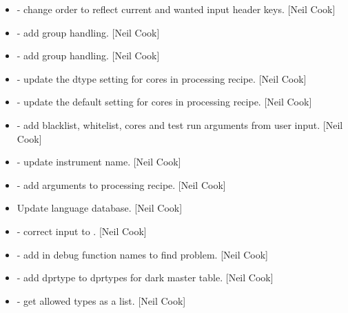 \documentclass[a4paper,10pt,english]{report}
\begin{document}
\begin{itemize}
\item {} 
 - change order to reflect
current and wanted input header keys. {[}Neil Cook{]}

\item {} 
 - add group handling. {[}Neil Cook{]}

\item {} 
 - add group handling. {[}Neil Cook{]}

\item {} 
 - update the dtype
setting for \textendash{}cores in processing recipe. {[}Neil Cook{]}

\item {} 
 - update the default
setting for \textendash{}cores in processing recipe. {[}Neil Cook{]}

\item {} 
 - add blacklist, whitelist, cores
and test run arguments from user input. {[}Neil Cook{]}

\item {} 
 - update instrument name. {[}Neil Cook{]}

\item {} 
 - add arguments to
processing recipe. {[}Neil Cook{]}

\item {} 
Update language database. {[}Neil Cook{]}

\item {} 
 - correct input to . {[}Neil Cook{]}

\item {} 
 - add in debug function names to find
problem. {[}Neil Cook{]}

\item {} 
 - add dprtype to dprtypes for dark master table.
{[}Neil Cook{]}

\item {} 
 - get allowed types as a
list. {[}Neil Cook{]}


\end{itemize}
\end{document}

